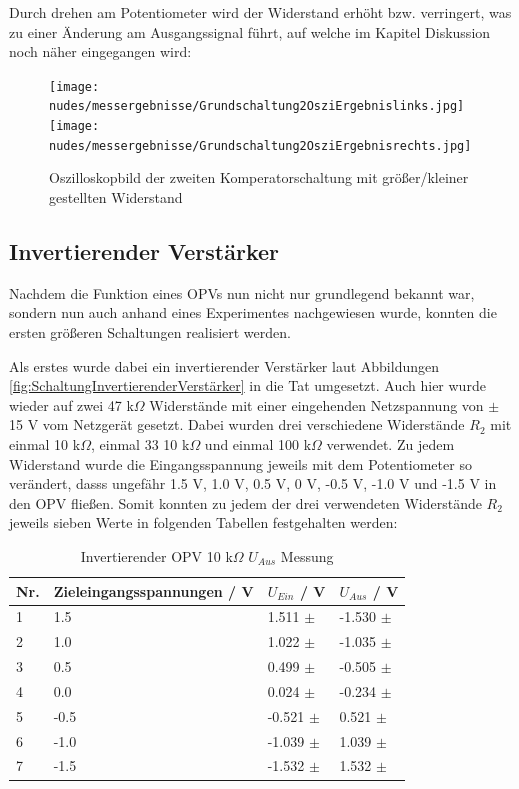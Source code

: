 \documentclass[12pt,a4paper,twoside]{article}
\begin{document}
\noindent
Durch drehen am Potentiometer wird der Widerstand erhöht bzw. verringert, was zu einer Änderung am Ausgangssignal führt, auf welche im Kapitel Diskussion noch näher eingegangen wird:

\begin{figure}[H]
    \centering
    \texttt{[image: nudes/messergebnisse/Grundschaltung2OsziErgebnislinks.jpg]}
    \texttt{[image: nudes/messergebnisse/Grundschaltung2OsziErgebnisrechts.jpg]}
    \caption{Oszilloskopbild der zweiten Komperatorschaltung mit größer/kleiner gestellten Widerstand}
    \label{fig:Grundschaltung2ErgebnissPoti}
\end{figure}

\subsection{Invertierender Verstärker}

Nachdem die Funktion eines OPVs nun nicht nur grundlegend bekannt war, sondern nun auch anhand eines Experimentes nachgewiesen wurde, konnten die ersten größeren Schaltungen realisiert werden. \newline

\noindent
Als erstes wurde dabei ein invertierender Verstärker laut Abbildungen \ref{fig:SchaltungInvertierenderVerstärker} in die Tat umgesetzt. Auch hier wurde wieder auf zwei 47 k$\Omega$ Widerstände mit einer eingehenden Netzspannung von $\pm$ 15 V vom Netzgerät gesetzt.
Dabei wurden drei verschiedene Widerstände $R_{2}$ mit einmal 10 k$\Omega$, einmal 33 10 k$\Omega$ und einmal 100 k$\Omega$ verwendet. Zu jedem Widerstand wurde die Eingangsspannung jeweils mit dem Potentiometer so verändert, dasss ungefähr 1.5 V, 1.0 V, 0.5 V, 0 V, -0.5 V, -1.0 V und -1.5 V in den OPV fließen. 
Somit konnten zu jedem der drei verwendeten Widerstände $R_{2}$ jeweils sieben Werte in folgenden Tabellen festgehalten werden:

\begin{table}[H]
    \centering
    \caption{Invertierender OPV 10 k$\Omega$ $U_{Aus}$ Messung}
    \label{tab:IoVerstärkungenGemessen10}
    \begin{tabular}{| l | l | l | l |}
        \hline
        Nr. & Zieleingangsspannungen / V & $U_{Ein}$ / V & $U_{Aus}$ / V \\
        \hline
        1 &  1.5 &  1.511 $\pm$  & -1.530 $\pm$  \\
        2 &  1.0 &  1.022 $\pm$  & -1.035 $\pm$  \\
        3 &  0.5 &  0.499 $\pm$  & -0.505 $\pm$  \\
        4 &  0.0 &  0.024 $\pm$  & -0.234 $\pm$  \\
        5 & -0.5 & -0.521 $\pm$  &  0.521 $\pm$  \\
        6 & -1.0 & -1.039 $\pm$  &  1.039 $\pm$  \\
        7 & -1.5 & -1.532 $\pm$  &  1.532 $\pm$  \\
        \hline
    \end{tabular}
\end{table}
\end{document}
